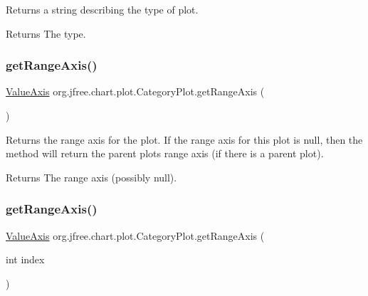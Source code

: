Returns a string describing the type of plot.

\begin{DoxyReturn}{Returns}
The type. 
\end{DoxyReturn}
\mbox{\label{classorg_1_1jfree_1_1chart_1_1plot_1_1_category_plot_a08c361dd63f47cfccbd61088009ee155}} 
\subsubsection{\texorpdfstring{get\+Range\+Axis()}{getRangeAxis()}\hspace{0.1cm}{\footnotesize\ttfamily [1/2]}}
{\footnotesize\ttfamily \mbox{\hyperlink{classorg_1_1jfree_1_1chart_1_1axis_1_1_value_axis}{Value\+Axis}} org.\+jfree.\+chart.\+plot.\+Category\+Plot.\+get\+Range\+Axis (\begin{DoxyParamCaption}{ }\end{DoxyParamCaption})}

Returns the range axis for the plot. If the range axis for this plot is null, then the method will return the parent plot\textquotesingle{}s range axis (if there is a parent plot).

\begin{DoxyReturn}{Returns}
The range axis (possibly {\ttfamily null}). 
\end{DoxyReturn}
\mbox{\label{classorg_1_1jfree_1_1chart_1_1plot_1_1_category_plot_a2b2f8a011636e469d20c314698e1a98d}} 
\subsubsection{\texorpdfstring{get\+Range\+Axis()}{getRangeAxis()}\hspace{0.1cm}{\footnotesize\ttfamily [2/2]}}
{\footnotesize\ttfamily \mbox{\hyperlink{classorg_1_1jfree_1_1chart_1_1axis_1_1_value_axis}{Value\+Axis}} org.\+jfree.\+chart.\+plot.\+Category\+Plot.\+get\+Range\+Axis (\begin{DoxyParamCaption}\item[{int}]{index }\end{DoxyParamCaption})}

